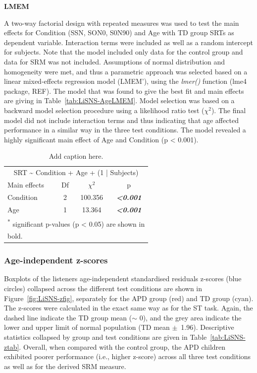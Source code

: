 \documentclass[a4paper, twoside]{templates/ociamthesis}
\begin{document}
\colorbox[HTML]{CCCCFF}{\textbf{LMEM}}

A two-way factorial design with repeated measures was used to test the main effects for Condition (SSN, SON0, S0N90) and Age with TD group SRTs as dependent variable. Interaction terms were included as well as a random intercept for subjects. Note that the model included only data for the control group and data for SRM was not included. Assumptions of normal distribution and homogeneity were met, and thus a parametric approach was selected based on a linear mixed-effects regression model (LMEM'), using the \emph{lmer()} function (lme4 package, REF). The model that was found to give the best fit and main effects are giving in Table~\ref{tab:LiSNS-AgeLMEM}. Model selection was based on a backward model selection procedure using a likelihood ratio test (\(\chi^{2}\)). The final model did not include interaction terms and thus indicating that age affected performance in a similar way in the three test conditions. The model revealed a highly significant main effect of Age and Condition (p \textless{} 0.001).

\begin{table}

\caption{\label{tab:LiSNS-AgeLMEMTab}Add caption here.}
\centering
\begin{tabular}[t]{lcc>{}c}
\toprule
\multicolumn{4}{c}{SRT \textasciitilde{} Condition + Age + (1 | Subjects)} \\
\cmidrule(l{3pt}r{3pt}){1-4}
Main effects & Df & $\chi^{2}$ & p\\
\midrule
Condition & 2 & 100.356 & \em{\textbf{<0.001}}\\
Age & 1 & 13.364 & \em{\textbf{<0.001}}\\
\bottomrule
\multicolumn{4}{l}{\textsuperscript{*} significant p-values (p < 0.05) are shown in}\\
\multicolumn{4}{l}{bold.}\\
\end{tabular}
\end{table}

\hypertarget{age-independent-z-scores-1}{%
\subsubsection*{Age-independent z-scores}\label{age-independent-z-scores-1}}

Boxplots of the listeners age-independent standardised residuals z-scores (blue circles) collapsed across the different test conditions are shown in Figure~\ref{fig:LiSNS-zfig}, separately for the APD group (red) and TD group (cyan). The z-scores were calculated in the exact same way as for the ST task. Again, the dashed line indicate the TD group mean (\(\sim\) 0), and the grey area indicate the lower and upper limit of normal population (TD mean \(\pm\)~1.96). Descriptive statistics collapsed by group and test conditions are given in Table~\ref{tab:LiSNS-ztab}. Overall, when compared with the control group, the APD children exhibited poorer performance (i.e., higher z-score) across all three test conditions as well as for the derived SRM measure.
\end{document}
